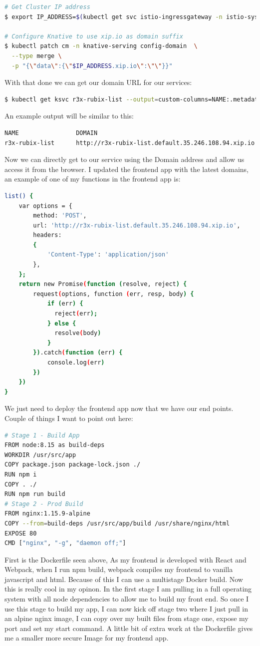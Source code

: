 \begin{lstlisting}[language=bash]
# Get Cluster IP address
$ export IP_ADDRESS=$(kubectl get svc istio-ingressgateway -n istio-system -ojsonpath='{.status.loadBalancer.ingress[0].ip}')

# Configure Knative to use xip.io as domain suffix
$ kubectl patch cm -n knative-serving config-domain  \
  --type merge \
  -p "{\"data\":{\"$IP_ADDRESS.xip.io\":\"\"}}"
\end{lstlisting}
With that done we can get our domain URL for our services:
\begin{lstlisting}[language=bash]
$ kubectl get ksvc r3x-rubix-list --output=custom-columns=NAME:.metadata.name,DOMAIN:.status.domain
\end{lstlisting}
An example output will be similar to this:
\begin{lstlisting}[language=bash]
NAME                DOMAIN
r3x-rubix-list      http://r3x-rubix-list.default.35.246.108.94.xip.io
\end{lstlisting}
Now we can directly get to our service using the Domain address and allow us access it from the browser. I updated the frontend app with the latest domains, an example of one of my functions in the frontend app is:
\begin{lstlisting}[language=bash]
  list() {
    var options = {
        method: 'POST',
        url: 'http://r3x-rubix-list.default.35.246.108.94.xip.io',
        headers:
        {
            'Content-Type': 'application/json'
        },
    };
    return new Promise(function (resolve, reject) {
        request(options, function (err, resp, body) {
            if (err) {
              reject(err);
            } else {
              resolve(body)
            }
        }).catch(function (err) {
            console.log(err)
        })
    })
}
\end{lstlisting}
We just need to deploy the frontend app now that we have our end points. Couple of things I want to point out here:
\begin{lstlisting}[language=bash]
# Stage 1 - Build App
FROM node:8.15 as build-deps
WORKDIR /usr/src/app
COPY package.json package-lock.json ./
RUN npm i
COPY . ./
RUN npm run build
# Stage 2 - Prod Build
FROM nginx:1.15.9-alpine
COPY --from=build-deps /usr/src/app/build /usr/share/nginx/html
EXPOSE 80
CMD ["nginx", "-g", "daemon off;"]
\end{lstlisting}
First is the Dockerfile seen above, As my frontend is developed with React and Webpack, when I run npm build, webpack compiles my frontend to vanilla javascript and html. Because of this I can use a multistage Docker build. Now this is really cool in my opinon. In the first stage I am pulling in a full operating system with all node dependencies to allow me to build my front end. So once I use this stage to build my app, I can now kick off stage two where I just pull in an alpine nginx image, I can copy over my built files from stage one, expose my port and set my start command. A little bit of extra work at the Dockerfile gives me a smaller more secure Image for my frontend app.

